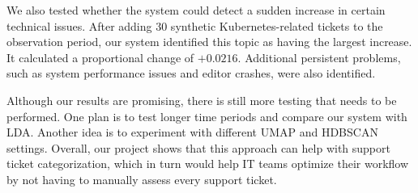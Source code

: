 \documentclass[11pt]{article}
\begin{document}
We also tested whether the system could detect a sudden increase in certain technical issues. After adding 30 synthetic Kubernetes-related tickets to the observation period, our system identified this topic as having the largest increase. It calculated a proportional change of $+0.0216$. Additional persistent problems, such as system performance issues and editor crashes, were also identified.

Although our results are promising, there is still more testing that needs to be performed. One plan is to test longer time periods and compare our system with LDA. Another idea is to experiment with different UMAP and HDBSCAN settings. Overall, our project shows that this approach can help with support ticket categorization, which in turn would help IT teams optimize their workflow by not having to manually assess every support ticket.


\end{document}
